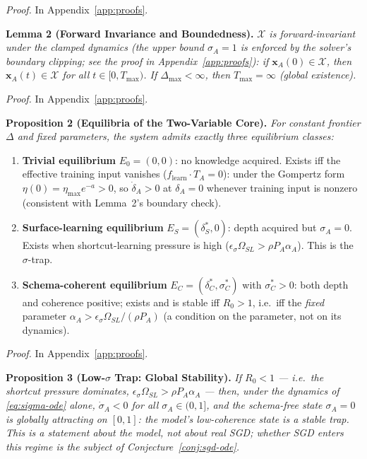 \documentclass{article}
\theoremstyle{definition}
\begin{document}
\emph{Proof.} In Appendix~\ref{app:proofs}.

\textbf{Lemma 2 (Forward Invariance and Boundedness).}
\emph{$\mathcal{X}$ is forward-invariant under the clamped dynamics
(the upper bound $\sigma_A = 1$ is enforced by the solver's boundary
clipping; see the proof in Appendix~\ref{app:proofs}): if
$\mathbf{x}_A(0) \in \mathcal{X}$, then $\mathbf{x}_A(t) \in \mathcal{X}$
for all $t \in [0, T_{\max})$. If $\Delta_{\max} < \infty$, then
$T_{\max} = \infty$ (global existence).}

\emph{Proof.} In Appendix~\ref{app:proofs}.

\textbf{Proposition 2 (Equilibria of the Two-Variable Core).}
\emph{For constant frontier $\Delta$ and fixed parameters, the system
admits exactly three equilibrium classes:}
\begin{enumerate}[nosep]
\item \textbf{Trivial equilibrium} $E_0 = (0, 0)$: no knowledge
  acquired. Exists iff the effective training input vanishes
  ($f_{\text{learn}} \cdot T_A = 0$): under the Gompertz form
  $\eta(0) = \eta_{\max} e^{-a} > 0$, so $\dot{\delta}_A > 0$ at
  $\delta_A = 0$ whenever training input is nonzero (consistent with
  Lemma~2's boundary check).
\item \textbf{Surface-learning equilibrium}
  $E_S = (\delta_S^*, 0)$: depth acquired but $\sigma_A = 0$. Exists
  when shortcut-learning pressure is high ($\epsilon_\sigma \Omega_{SL} >
  \rho P_A \alpha_A$). This is the $\sigma$-trap.
\item \textbf{Schema-coherent equilibrium}
  $E_C = (\delta_C^*, \sigma_C^*)$ with $\sigma_C^* > 0$: both depth and
  coherence positive; exists and is stable iff $R_0 > 1$, i.e.\ iff the
  \emph{fixed} parameter $\alpha_A > \epsilon_\sigma \Omega_{SL} /
  (\rho P_A)$ (a condition on the parameter, not on its dynamics).
\end{enumerate}

\emph{Proof.} In Appendix~\ref{app:proofs}.

\textbf{Proposition 3 (Low-$\sigma$ Trap: Global Stability).}
\emph{If $R_0 < 1$ --- i.e.\ the shortcut pressure dominates,
$\epsilon_\sigma \Omega_{SL} > \rho P_A \alpha_A$ --- then, under the
dynamics of \eqref{eq:sigma-ode} alone, $\dot{\sigma}_A < 0$ for all
$\sigma_A \in (0,1]$, and the schema-free state $\sigma_A = 0$ is
\emph{globally} attracting on $[0,1]$: the model's low-coherence state
is a stable trap. This is a statement about the model, not about real
SGD; whether SGD enters this regime is the subject of
Conjecture~\ref{conj:sgd-ode}.}
\end{document}

